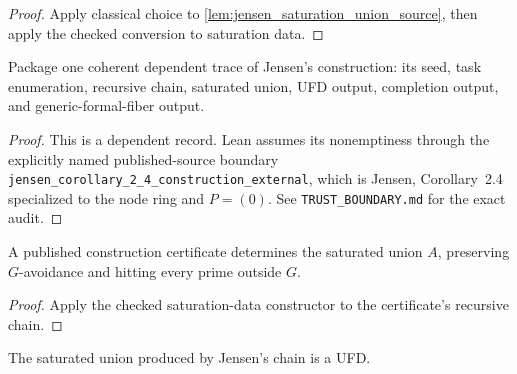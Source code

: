 \begin{proof}
  Apply classical choice to \cref{lem:jensen_saturation_union_source}, then
  apply the checked conversion to saturation data.
\end{proof}

\begin{definition}
  \label{def:jensen_published_construction_data}
  Package one coherent dependent trace of Jensen's construction: its seed,
  task enumeration, recursive chain, saturated union, UFD output, completion
  output, and generic-formal-fiber output.
\end{definition}

\begin{proof}
  This is a dependent record.  Lean assumes its nonemptiness through the
  explicitly named published-source boundary
  \texttt{jensen\_corollary\_2\_4\_construction\_external}, which is Jensen,
  Corollary~2.4 specialized to the node ring and \(P=(0)\).  See
  \texttt{TRUST\_BOUNDARY.md} for the exact audit.
\end{proof}

\begin{lemma}
  \label{lem:jensen_saturation_source}
  A published construction certificate determines the saturated union \(A\),
  preserving \(G\)-avoidance and hitting every prime outside \(G\).
\end{lemma}

\begin{proof}
  Apply the checked saturation-data constructor to the certificate's recursive
  chain.
\end{proof}

\begin{lemma}
  \label{lem:jensen_ufd_output_source}
  The saturated union produced by Jensen's chain is a UFD.
\end{lemma}


